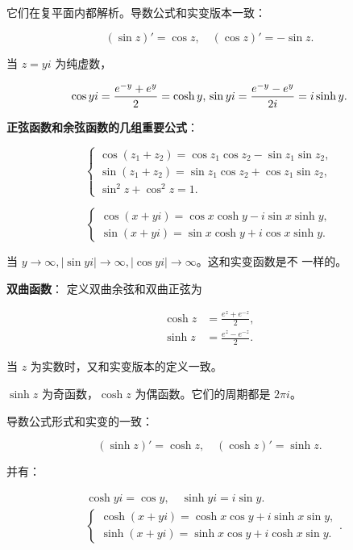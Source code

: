 它们在复平面内都解析。导数公式和实变版本一致：

\[
(\sin z)'=\cos z,\quad (\cos z)'=-\sin z.
\]

当 \(z=yi\) 为纯虚数，

\[
\cos yi=\frac{e^{-y}+e^y}{2}=\cosh y,\\
\sin yi=\frac{e^{-y}-e^y}{2i}=i\sinh y.
\]

\textbf{正弦函数和余弦函数的几组重要公式}：

\begin{equation*}
\begin{cases}
\cos(z_{1}+z_{2})=\cos z_{1}\cos z_{2}-\sin z_{1}\sin z_{2}, \\
\sin(z_{1}+z_{2})=\sin z_{1}\cos z_{2}+\cos z_{1}\sin z_{2}, \\
\sin^{2}z+\cos^{2}z=1.
\end{cases}
\end{equation*}

\begin{equation*}
\begin{cases}
\cos(x+y i)=\cos x\cosh y-i\sin x\sinh y, \\
\sin(x+y i)=\sin x\cosh y+i\cos x\sinh y.
\end{cases}
\end{equation*}

当 \(y \to \infty,|\sin yi| \to \infty,|\cos yi| \to \infty\)。这和实变函数是不
一样的。

\textbf{双曲函数}： 定义双曲余弦和双曲正弦为

\begin{equation*}
\begin{aligned}
    \cosh z &= \frac{e^z+e^{-z}}{2},\\
    \sinh z &= \frac{e^z-e^{-z}}{2}.
\end{aligned}
\end{equation*}

当 \(z\) 为实数时，又和实变版本的定义一致。

\(\sinh z\) 为奇函数，\(\cosh z\) 为偶函数。它们的周期都是 \(2\pi i\)。

导数公式形式和实变的一致：

\[
(\sinh z)'=\cosh z,\quad (\cosh z)'=\sinh z.
\]

并有：

\begin{equation*}
\begin{aligned}
    &\cosh y i=\cos y,\quad
    \sinh y i=i \sin y. \\
    &\begin{cases}
        \cosh (x+yi)=\cosh x \cos y+i \sinh x \sin y, \\
        \sinh (x+yi)=\sinh x \cos y+i \cosh x \sin y.
    \end{cases}.
\end{aligned}
\end{equation*}
